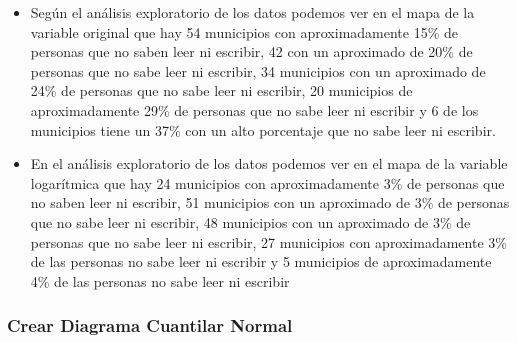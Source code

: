 \documentclass[11pt,]{article}
\newenvironment{Shaded}{\begin{snugshade}}{\end{snugshade}}
\newcommand{\KeywordTok}[1]{\textcolor[rgb]{0.13,0.29,0.53}{\textbf{#1}}}
\newcommand{\DataTypeTok}[1]{\textcolor[rgb]{0.13,0.29,0.53}{#1}}
\newcommand{\DecValTok}[1]{\textcolor[rgb]{0.00,0.00,0.81}{#1}}
\newcommand{\StringTok}[1]{\textcolor[rgb]{0.31,0.60,0.02}{#1}}
\newcommand{\OperatorTok}[1]{\textcolor[rgb]{0.81,0.36,0.00}{\textbf{#1}}}
\newcommand{\NormalTok}[1]{#1}
\begin{document}
\begin{itemize}
\item
  Según el análisis exploratorio de los datos podemos ver en el mapa de
  la variable original que hay 54 municipios con aproximadamente 15\% de
  personas que no saben leer ni escribir, 42 con un aproximado de 20\%
  de personas que no sabe leer ni escribir, 34 municipios con un
  aproximado de 24\% de personas que no sabe leer ni escribir, 20
  municipios de aproximadamente 29\% de personas que no sabe leer ni
  escribir y 6 de los municipios tiene un 37\% con un alto porcentaje
  que no sabe leer ni escribir.
\item
  En el análisis exploratorio de los datos podemos ver en el mapa de la
  variable logarítmica que hay 24 municipios con aproximadamente 3\% de
  personas que no saben leer ni escribir, 51 municipios con un
  aproximado de 3\% de personas que no sabe leer ni escribir, 48
  municipios con un aproximado de 3\% de personas que no sabe leer ni
  escribir, 27 municipios con aproximadamente 3\% de las personas no
  sabe leer ni escribir y 5 municipios de aproximadamente 4\% de las
  personas no sabe leer ni escribir
\end{itemize}

\subsubsection{Crear Diagrama Cuantilar
Normal}\label{crear-diagrama-cuantilar-normal}

\begin{Shaded}
\end{Shaded}
\end{document}
